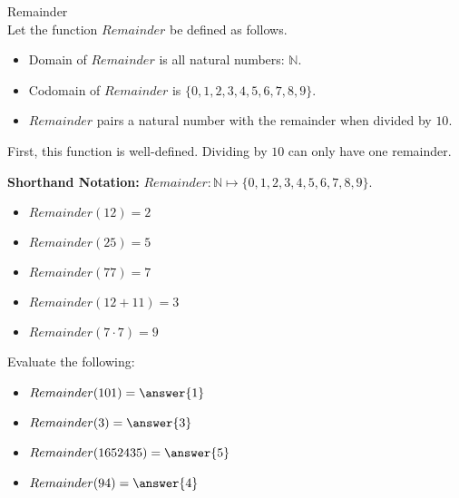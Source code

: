 \documentclass{ximera}
\begin{document}
\begin{example} Remainder \\

Let the function $Remainder$ be defined as follows.


\begin{itemize}
\item Domain of $Remainder$ is all natural numbers: $\mathbb{N}$.
\item Codomain of $Remainder$ is $\{ 0, 1, 2, 3, 4, 5, 6, 7, 8, 9 \}$.
\item $Remainder$ pairs a natural number with the remainder when divided by $10$.
\end{itemize}


First, this function is well-defined. Dividing by $10$ can only have one remainder.


\textbf{Shorthand Notation: } $Remainder: \mathbb{N} \mapsto \{ 0, 1, 2, 3, 4, 5, 6, 7, 8, 9 \}$.



\begin{example}

\begin{itemize}
	\item $Remainder(12) = 2$
	\item $Remainder(25) = 5$
	\item $Remainder(77) = 7$
	\item $Remainder(12 + 11) = 3$
	\item $Remainder(7 \cdot 7) = 9$
\end{itemize}

\end{example}







\begin{question}
Evaluate the following:

\begin{itemize}
	\item $Remainder(101) = \answer{1}$
	\item $Remainder(3) = \answer{3}$
	\item $Remainder(1652435) = \answer{5}$
	\item $Remainder(94) = \answer{4}$
\end{itemize}

\end{question}



\end{example}
\end{document}
